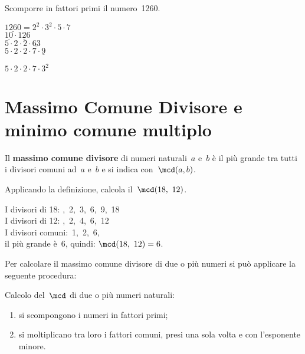 \begin{esempio}{}{}
Scomporre in fattori primi il numero~1260.

\vspace{.5em}
\(\underline{1260} = 2^{2} \cdot 3^{2} \cdot 5 \cdot 7\)\\
\(\underline{10} \cdot \underline{126}\)\\
\(5 \cdot 2 \cdot 2 \cdot \underline{63}\)\\
\(5 \cdot 2 \cdot 2 \cdot 7 \cdot \underline{9}\)

\(5 \cdot 2 \cdot 2 \cdot 7 \cdot 3^{2}\)

\end{esempio}


\section{Massimo Comune Divisore e minimo comune multiplo}
\label{sec:nat_mcdemcm}

\label{def:mcd}
\begin{definizione}{}{}
Il \textbf{massimo comune divisore} di numeri naturali~\(a\) e~\(b\)  è il
più grande tra tutti i divisori comuni ad~\(a\) e~\(b\)
e si indica con~\(\mcd(a,b)\).
\end{definizione}

\begin{esempio}{}{}
Applicando la definizione, calcola il~\(\mcd(18,~12)\).

I divisori di 18: ,~2,~3,~6,~9,~18\\
I divisori di 12: ,~2,~4,~6,~12\\
I divisori comuni:~1,~2,~6, \\
il più grande è~6, quindi: \quad \(\mcd(18,~12) = 6\). 
\end{esempio}


Per calcolare il massimo comune divisore di due o più numeri si può 
applicare la seguente procedura:

\begin{procedura}{}{}
Calcolo del~\(\mcd\) di due o più numeri naturali:
\begin{enumerate}[noitemsep, label=(\alph*)]
 \item si scompongono i numeri in fattori primi;
 \item si moltiplicano tra loro i fattori comuni, 
  presi una sola volta e con l'esponente minore.
\end{enumerate}
\end{procedura}

